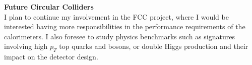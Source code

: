 \documentclass[12pt]{article}
\begin{document}
\noindent
{\bf Future Circular Colliders}\\
I plan to continue my involvement in the FCC project, where I would be interested having more responsibilities in the performance requirements of the calorimeters.
I also foresee to study physics benchmarks such as signatures involving high $p_T$ top quarks and bosons, or double Higgs production 
and their impact on the detector design.







\end{document}
